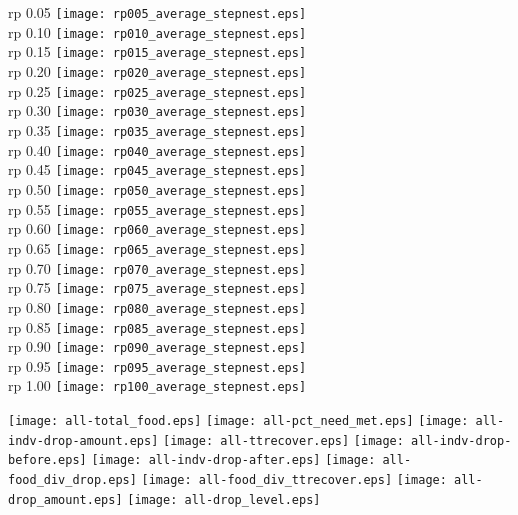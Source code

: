 \documentclass{article}
\begin{document}
rp 0.05 \texttt{[image: rp005\_average\_stepnest.eps]}\\
rp 0.10 \texttt{[image: rp010\_average\_stepnest.eps]}\\
rp 0.15 \texttt{[image: rp015\_average\_stepnest.eps]}\\
rp 0.20 \texttt{[image: rp020\_average\_stepnest.eps]}\\
rp 0.25 \texttt{[image: rp025\_average\_stepnest.eps]}\\
rp 0.30 \texttt{[image: rp030\_average\_stepnest.eps]}\\
rp 0.35 \texttt{[image: rp035\_average\_stepnest.eps]}\\
rp 0.40 \texttt{[image: rp040\_average\_stepnest.eps]}\\
rp 0.45 \texttt{[image: rp045\_average\_stepnest.eps]}\\
rp 0.50 \texttt{[image: rp050\_average\_stepnest.eps]}\\
rp 0.55 \texttt{[image: rp055\_average\_stepnest.eps]}\\
rp 0.60 \texttt{[image: rp060\_average\_stepnest.eps]}\\
rp 0.65 \texttt{[image: rp065\_average\_stepnest.eps]}\\
rp 0.70 \texttt{[image: rp070\_average\_stepnest.eps]}\\
rp 0.75 \texttt{[image: rp075\_average\_stepnest.eps]}\\
rp 0.80 \texttt{[image: rp080\_average\_stepnest.eps]}\\
rp 0.85 \texttt{[image: rp085\_average\_stepnest.eps]}\\
rp 0.90 \texttt{[image: rp090\_average\_stepnest.eps]}\\
rp 0.95 \texttt{[image: rp095\_average\_stepnest.eps]}\\
rp 1.00 \texttt{[image: rp100\_average\_stepnest.eps]}\\

\newpage

\texttt{[image: all-total\_food.eps]}
\texttt{[image: all-pct\_need\_met.eps]}
\texttt{[image: all-indv-drop-amount.eps]}
\texttt{[image: all-ttrecover.eps]}
\texttt{[image: all-indv-drop-before.eps]}
\texttt{[image: all-indv-drop-after.eps]}
\texttt{[image: all-food\_div\_drop.eps]}
\texttt{[image: all-food\_div\_ttrecover.eps]}
\texttt{[image: all-drop\_amount.eps]}
\texttt{[image: all-drop\_level.eps]}

%
%
\end{document}
